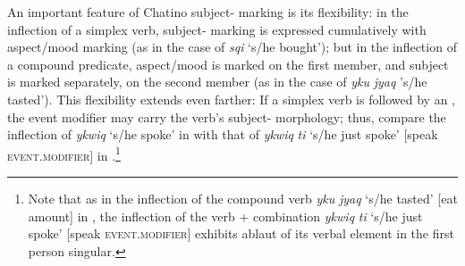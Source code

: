 \documentclass[output=paper]{langsci/langscibook}
\begin{document}
An important feature of Chatino subject- marking is its flexibility:  in the inflection of a simplex verb, subject- marking is expressed cumulatively with aspect/mood marking (as in the case of \emph{sqi} `s/he bought'\textemdash {}); but in the inflection of a compound predicate, aspect/mood is marked on the first member, and subject  is marked separately, on the second member (as in the case of \emph{yku} \emph{jyaq} 's/he tasted'\textemdash {}).  This flexibility extends even farther:  If a simplex verb is followed by an , the event modifier may carry the verb's subject- morphology; thus, compare the inflection of \emph{ykwiq} `s/he spoke' in  with that of  \emph{ykwiq} \emph{ti} `s/he just spoke' [speak \textsc{event.modifier}] in .\footnote{Note that as in the inflection of the compound verb  \emph{yku} \emph{jyaq} `s/he tasted' [eat amount] in , the inflection of the verb +  combination \emph{ykwiq} \emph{ti} `s/he just spoke' [speak \textsc{event.modifier}] exhibits ablaut of its verbal element in the first person singular.}
\end{document}
